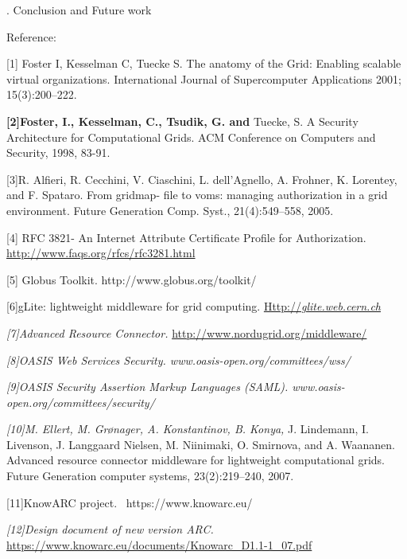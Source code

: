 \documentclass{article}
\newcommand\textstyleStrongEmphasis[1]{\textbf{#1}}
\newcommand\textstyleCitation[1]{\textit{#1}}
\begin{document}
\bigskip

{. Conclusion and Future work
\par}


\bigskip


\bigskip

Reference:

[1] Foster I, Kesselman C, Tuecke S. The anatomy of the Grid: Enabling
scalable virtual organizations. International Journal of Supercomputer
Applications 2001; 15(3):200--222. 

\textstyleStrongEmphasis{\textmd{[2]}}\textstyleStrongEmphasis{\textmd{Foster,
I., Kesselman, C., Tsudik, G. and }}Tuecke, S. A Security Architecture
for Computational Grids. ACM Conference on Computers and Security,
1998, 83-91.

[3]R. Alfieri, R. Cecchini, V. Ciaschini, L.
dell{\textquoteright}Agnello, A. Frohner, K. Lorentey, and F. Spataro.
From gridmap- file to voms: managing authorization in a grid
environment. Future Generation Comp. Syst., 21(4):549--558, 2005. 

[4] RFC 3821- An Internet Attribute Certificate Profile for
Authorization. \url{http://www.faqs.org/rfcs/rfc3281.html}

[5] Globus Toolkit. http://www.globus.org/toolkit/

[6]gLite: lightweight middleware for grid computing.
\href{http://glite.web.cern.ch/}{Http://}\href{http://glite.web.cern.ch/}{\textstyleCitation{\textup{glite.web.cern.ch}}}

\textstyleCitation{\textup{[7]Advanced Resource Connector.
}}\url{http://www.nordugrid.org/middleware/}

\textstyleCitation{\textup{[8]OASIS Web Services Security.
www.oasis-open.org/committees/wss/}}

\textstyleCitation{\textup{[9]OASIS Security Assertion Markup Languages
(SAML). www.oasis-open.org/committees/security/}}

\textstyleCitation{\textup{[10]}}\textstyleCitation{\textup{M. Ellert,
M. Gr{\o}nager, A. Konstantinov, B. Konya, }}J. Lindemann, I. Livenson,
J. Langgaard Nielsen, M. Niinimaki, O. Smirnova, and A. Waananen.
Advanced resource connector middleware for lightweight computational
grids. Future Generation computer systems, 23(2):219--240, 2007.

[11]KnowARC project. \ https://www.knowarc.eu/

\textstyleCitation{\textup{[12]Design document of new version ARC.
}}\url{https://www.knowarc.eu/documents/Knowarc_D1.1-1_07.pdf}
\end{document}
